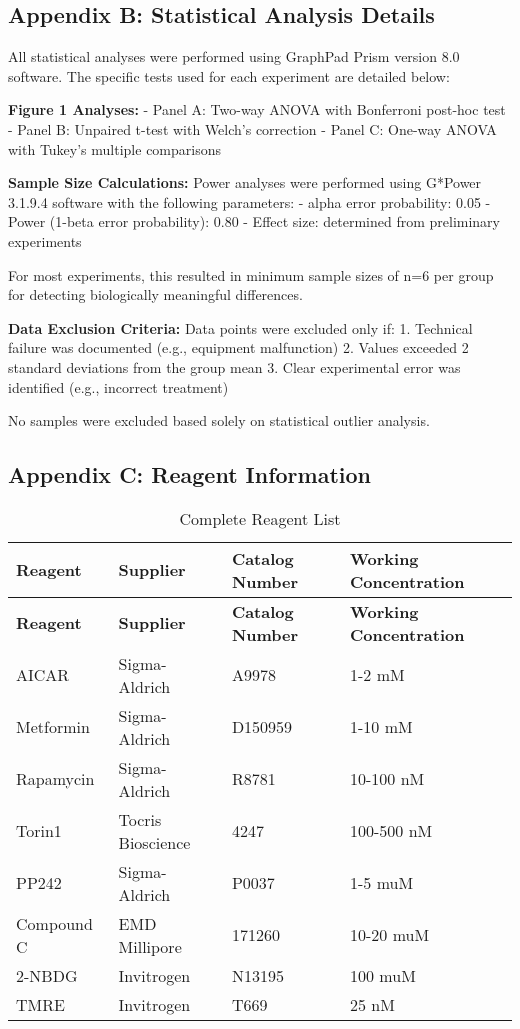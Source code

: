 \documentclass[11pt,a4paper]{article}
\begin{document}
\subsection*{Appendix B: Statistical Analysis Details}

All statistical analyses were performed using GraphPad Prism version 8.0 software. The specific tests used for each experiment are detailed below:

\textbf{Figure 1 Analyses:}
- Panel A: Two-way ANOVA with Bonferroni post-hoc test
- Panel B: Unpaired t-test with Welch's correction
- Panel C: One-way ANOVA with Tukey's multiple comparisons

\textbf{Sample Size Calculations:}
Power analyses were performed using G*Power 3.1.9.4 software with the following parameters:
- alpha error probability: 0.05
- Power (1-beta error probability): 0.80
- Effect size: determined from preliminary experiments

For most experiments, this resulted in minimum sample sizes of n=6 per group for detecting biologically meaningful differences.

\textbf{Data Exclusion Criteria:}
Data points were excluded only if:
1. Technical failure was documented (e.g., equipment malfunction)
2. Values exceeded 2 standard deviations from the group mean
3. Clear experimental error was identified (e.g., incorrect treatment)

No samples were excluded based solely on statistical outlier analysis.

\subsection*{Appendix C: Reagent Information}

\begin{longtable}{|p{3cm}|p{3cm}|p{3cm}|p{4cm}|}
\caption{Complete Reagent List} \\
\hline
\textbf{Reagent} & \textbf{Supplier} & \textbf{Catalog Number} & \textbf{Working Concentration} \\
\hline
\endfirsthead
\hline
\textbf{Reagent} & \textbf{Supplier} & \textbf{Catalog Number} & \textbf{Working Concentration} \\
\hline
\endhead
AICAR & Sigma-Aldrich & A9978 & 1-2 mM \\
Metformin & Sigma-Aldrich & D150959 & 1-10 mM \\
Rapamycin & Sigma-Aldrich & R8781 & 10-100 nM \\
Torin1 & Tocris Bioscience & 4247 & 100-500 nM \\
PP242 & Sigma-Aldrich & P0037 & 1-5 muM \\
Compound C & EMD Millipore & 171260 & 10-20 muM \\
2-NBDG & Invitrogen & N13195 & 100 muM \\
TMRE & Invitrogen & T669 & 25 nM \\
\hline
\end{longtable}
\end{document}
